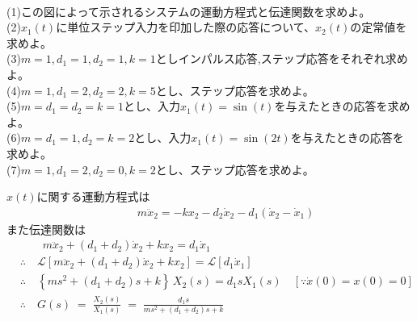 \documentclass[a4paper,12pt]{article}
\begin{document}
\begin{minipage}[t]{0.35\linewidth}
\begin{center}
    \end{center}
\end{minipage}\\

\indent
(1)この図によって示されるシステムの運動方程式と伝達関数を求めよ。\\

\indent
(2)\(x_1(t)\)に単位ステップ入力を印加した際の応答について、\(x_2(t)\)の定常値を求めよ。\\

\indent
(3)\(m=1,d_1=1,d_2=1,k=1\)としインパルス応答,ステップ応答をそれぞれ求めよ。\\

\indent
(4)\(m=1,d_1=2,d_2=2,k=5\)とし、ステップ応答を求めよ。\\

\indent
(5)\(m=d_1=d_2=k=1\)とし、入力\(x_1(t)=\sin(t)\)を与えたときの応答を求めよ。\\

\indent
(6)\(m=d_1=1,d_2=k=2\)とし、入力\(x_1(t)=\sin(2t)\)を与えたときの応答を求めよ。\\

\indent
(7)\(m=1,d_1=2,d_2=0,k=2\)とし、ステップ応答を求めよ。

\begin{tcolorbox}[title={5. (1)この図によって示されるシステムの運動方程式と伝達関数を求めよ。 
    }]

    \(x(t)\)に関する運動方程式は
    \vspace{-4mm}
    \begin{align*}
        &\qquad m\ddot{x}_2 =-k x_2 - d_2 \dot{x}_2 - d_1 \left(\dot{x}_2 - \dot{x}_1\right) 
    \end{align*}
    \vspace{-4mm}
    また伝達関数は
    \begin{align*}
        &\qquad m\ddot{x}_2 +  (d_1+d_2) \dot{x}_2 + k x_2
        = d_1 \dot{x}_1 \\
        &\therefore \quad \mathcal{L} \left[m\ddot{x}_2 +  (d_1+d_2) \dot{x}_2 + k x_2\right] 
        =\mathcal{L} \left[d_1 \dot{x}_1 \right] \\
        &\therefore \quad \left\{m s^2 +(d_1+d_2) s + k \right\}\,X_2(s) = d_1 s  X_1(s) \quad [\because \dot{x}(0)=x(0)=0 ]\\
        &\therefore \quad G(s) \;=\;\frac{X_2(s)}{X_1(s)}
        \;=\;\frac{d_1 s}{m s^2 +(d_1+d_2) s + k}
    \end{align*}
\end{tcolorbox}
\end{document}
